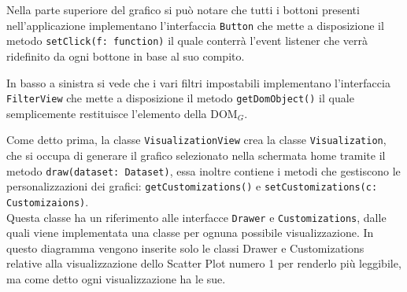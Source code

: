 Nella parte superiore del grafico si può notare che tutti i bottoni presenti nell'applicazione implementano l'interfaccia \texttt{Button} che mette a disposizione il metodo \texttt{setClick(f: function)} il quale conterrà l'event listener che verrà ridefinito da ogni bottone in base al suo compito.

In basso a sinistra si vede che i vari filtri impostabili implementano l'interfaccia \texttt{FilterView} che mette a disposizione il metodo \texttt{getDomObject()} il quale semplicemente restituisce l'elemento della DOM$_G$.

Come detto prima, la classe \texttt{VisualizationView} crea la classe \texttt{Visualization}, che si occupa di generare il grafico selezionato nella schermata home tramite il metodo \texttt{draw(dataset: Dataset)}, essa inoltre contiene i metodi che gestiscono le personalizzazioni dei grafici: \texttt{getCustomizations()} e \texttt{setCustomizations(c: Customizaions)}. \\Questa classe ha un riferimento alle interfacce \texttt{Drawer} e \texttt{Customizations}, dalle quali viene implementata una classe per ognuna possibile visualizzazione. In questo diagramma vengono inserite solo le classi Drawer e Customizations relative alla visualizzazione dello Scatter Plot numero 1 per renderlo più leggibile, ma come detto ogni visualizzazione ha le sue.


